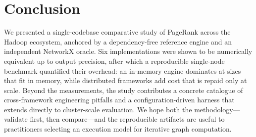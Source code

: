 \section{Conclusion}
\label{sec:conclusion}
We presented a single-codebase comparative study of PageRank across the Hadoop
ecosystem, anchored by a dependency-free reference engine and an independent
NetworkX oracle. Six implementations were shown to be numerically equivalent up
to output precision, after which a reproducible single-node benchmark quantified
their overhead: an in-memory engine dominates at sizes that fit in memory, while
distributed frameworks add cost that is repaid only at scale. Beyond the
measurements, the study contributes a concrete catalogue of cross-framework
engineering pitfalls and a configuration-driven harness that extends directly to
cluster-scale evaluation. We hope both the methodology---validate first, then
compare---and the reproducible artifacts are useful to practitioners selecting an
execution model for iterative graph computation.

